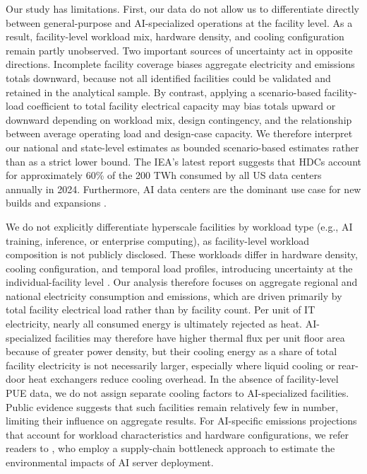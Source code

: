 \documentclass[12pt]{article}
\begin{document}
Our study has limitations. First, our data do not allow us to differentiate directly between general-purpose and AI-specialized operations at the facility level. As a result, facility-level workload mix, hardware density, and cooling configuration remain partly unobserved. Two important sources of uncertainty act in opposite directions. Incomplete facility coverage biases aggregate electricity and emissions totals downward, because not all identified facilities could be validated and retained in the analytical sample. By contrast, applying a scenario-based facility-load coefficient to total facility electrical capacity may bias totals upward or downward depending on workload mix, design contingency, and the relationship between average operating load and design-case capacity. We therefore interpret our national and state-level estimates as bounded scenario-based estimates rather than as a strict lower bound.  The  IEA's latest report \cite{iea2025energyai} suggests that HDCs account for approximately 60\% of the 200 TWh consumed by all US data centers annually in 2024. Furthermore, AI data centers are the dominant use case for new builds and expansions \cite{Colliers2025DataCenter}.

We do not explicitly differentiate hyperscale facilities by workload type (e.g., AI training, inference, or enterprise computing), as facility-level workload composition is not publicly disclosed. 
These workloads differ in hardware density, cooling configuration, and temporal load profiles, introducing uncertainty at the individual-facility level \cite{chokse2024llmpower}. 
Our analysis therefore focuses on aggregate regional and national electricity consumption and emissions, which are driven primarily by total facility electrical load rather than by facility count. 
Per unit of IT electricity, nearly all consumed energy is ultimately rejected as heat. AI-specialized facilities may therefore have higher thermal flux per unit floor area because of greater power density, but their cooling energy as a share of total facility electricity is not necessarily larger, especially where liquid cooling or rear-door heat exchangers reduce cooling overhead. In the absence of facility-level PUE data, we do not assign separate cooling factors to AI-specialized facilities. Public evidence suggests that such facilities remain relatively few in number, limiting their influence on aggregate results. For AI-specific emissions projections that account for workload characteristics and hardware configurations, we refer readers to \cite{xiao2025environmental}, who employ a supply-chain bottleneck approach to estimate the environmental impacts of AI server deployment.
\end{document}
